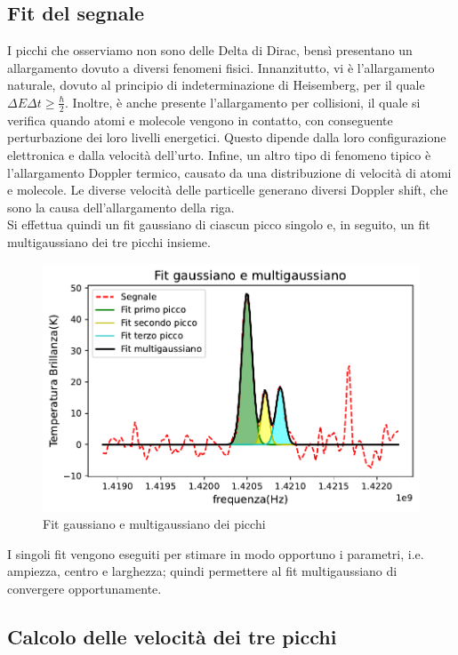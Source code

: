 \subsection{Fit del segnale}
\label{Fit del segnale}

I picchi che osserviamo non sono delle Delta di Dirac, bensì presentano un allargamento dovuto a diversi fenomeni fisici. Innanzitutto, vi è l'allargamento naturale, dovuto al principio di indeterminazione di Heisemberg, per il quale $\Delta E\Delta t\geq\frac{\hbar}{2}$. Inoltre, è anche presente l'allargamento per collisioni, il quale si verifica quando atomi e molecole vengono in contatto, con conseguente perturbazione dei loro livelli energetici. Questo dipende dalla loro configurazione elettronica e dalla velocità dell'urto. Infine, un altro tipo di fenomeno tipico è l'allargamento Doppler termico, causato da una distribuzione di velocità di atomi e molecole. Le diverse velocità delle particelle generano diversi Doppler shift, che sono la causa dell'allargamento della riga.\\
Si effettua quindi un fit gaussiano di ciascun picco singolo e, in seguito, un fit multigaussiano dei tre picchi insieme.

\begin{figure}[H]
	\centering
	\includegraphics[scale=0.8]{Tre_picchi.pdf}
	\caption{Fit gaussiano e multigaussiano dei picchi}
    	\label{fig:Tre_picchi}
\end{figure}

I singoli fit vengono eseguiti per stimare in modo opportuno i parametri, i.e. ampiezza, centro e larghezza; quindi permettere al fit multigaussiano di convergere opportunamente. 

\subsection{Calcolo delle velocità dei tre picchi}
\label{Calcolo delle velocità dei tre picchi}

